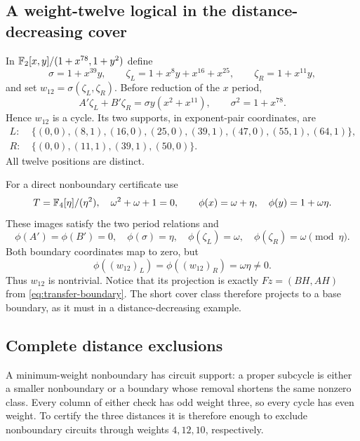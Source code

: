\subsection{A weight-twelve logical in the distance-decreasing cover}
In $\mathbb F_2[x,y]/(1+x^{78},1+y^2)$ define
\[
 \sigma=1+x^{39}y,\qquad
 \zeta_L=1+x^8y+x^{16}+x^{25},\qquad
 \zeta_R=1+x^{11}y,
\]
and set $w_{12}=\sigma(\zeta_L,\zeta_R)$. Before reduction of the $x$ period,
\[
 A'\zeta_L+B'\zeta_R=\sigma y(x^2+x^{11}),\qquad
 \sigma^2=1+x^{78}.
\]
Hence $w_{12}$ is a cycle. Its two supports, in exponent-pair coordinates, are
\begin{align*}
 L:\ &\{(0,0),(8,1),(16,0),(25,0),(39,1),(47,0),(55,1),(64,1)\},\\
 R:\ &\{(0,0),(11,1),(39,1),(50,0)\}.
\end{align*}
All twelve positions are distinct.

For a direct nonboundary certificate use
\[
 T=\mathbb F_4[\eta]/(\eta^2),\quad \omega^2+\omega+1=0,\qquad
 \phi(x)=\omega+\eta,\quad \phi(y)=1+\omega\eta.
\]
These images satisfy the two period relations and
\[
 \phi(A')=\phi(B')=0,\quad
 \phi(\sigma)=\eta,\quad
 \phi(\zeta_L)=\omega,\quad
 \phi(\zeta_R)=\omega\pmod\eta.
\]
Both boundary coordinates map to zero, but
\begin{equation}\label{eq:dual-numbers}
 \phi((w_{12})_L)=\phi((w_{12})_R)=\omega\eta\ne0.
\end{equation}
Thus $w_{12}$ is nontrivial. Notice that its projection is exactly $Fz=(BH,AH)$ from \eqref{eq:transfer-boundary}. The short cover class therefore projects to a base boundary, as it must in a distance-decreasing example.

\subsection{Complete distance exclusions}
A minimum-weight nonboundary has circuit support: a proper subcycle is either a smaller nonboundary or a boundary whose removal shortens the same nonzero class. Every column of either check has odd weight three, so every cycle has even weight. To certify the three distances it is therefore enough to exclude nonboundary circuits through weights $4,12,10$, respectively.

